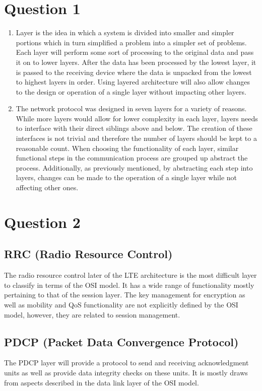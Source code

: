 \documentclass[12pt,letterpaper]{article}
\begin{document}
\section*{Question 1}

\begin{enumerate}[label=\alph*)]
  \item
   Layer is the idea in which a system is divided into smaller and simpler
   portions which in turn simplified a problem into a simpler set of problems.
   Each layer will perform some sort of processing to the original
   data and pass it on to lower layers. After the data has been processed by the
   lowest layer, it is passed to the receiving device where the data is unpacked
   from the lowest to highest layers in order. Using layered architecture will also
   allow changes to the design or operation of a single layer without impacting
   other layers.
  \item
   The network protocol was designed in seven layers for a variety of reasons.
   While more layers would allow for lower complexity in each layer,
   layers needs to interface with their direct siblings above and below.
   The creation of these interfaces is not trivial and therefore the number of
   layers should be kept to a reasonable count. When choosing the functionality
   of each layer, similar functional steps in the communication process are
   grouped up abstract the process. Additionally, as previously mentioned, by
   abstracting each step into layers, changes can be made to the operation of a
   single layer while not affecting other ones.
\end{enumerate}

\section*{Question 2}
\subsection*{RRC (Radio Resource Control)}
The radio resource control later of the LTE architecture is the most difficult
layer to classify in terms of the OSI model. It has a wide range of functionality
mostly pertaining to that of the session layer. The key management for encryption
as well as mobility and QoS functionality are not explicitly defined by the OSI
model, however, they are related to session management.

\subsection*{PDCP (Packet Data Convergence Protocol)}
The PDCP layer will provide a protocol to send and receiving acknowledgment
units as well as provide data integrity checks on these units. It is mostly draws
from aspects described in the data link layer of the OSI model.
\end{document}
